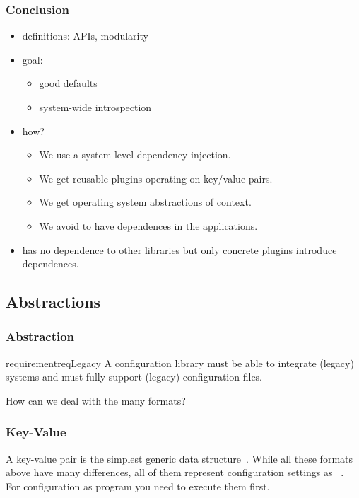 \begin{frame}
	\frametitle{Conclusion}
	\begin{itemize}
	\item definitions: APIs, modularity
	\item goal:
		\begin{itemize}
		\item good defaults
		\item system-wide introspection
		\end{itemize}
	\item how?
		\begin{itemize}
		\item We use a system-level dependency injection.
		\item We get reusable plugins operating on key/value pairs.
		\item We get operating system abstractions of context.
		\item We avoid to have dependences in the applications.
		\end{itemize}
	\item \elektra{} has no dependence to other libraries but only concrete plugins introduce dependences.
	\end{itemize}
\end{frame}






\subsection{Abstractions}

\begin{frame}
	\frametitle{Abstraction}
	\begin{restatable}{requirement}{reqLegacy}
	A configuration library must be able to integrate (legacy) systems and must fully support (legacy) configuration files.%
	\label{req:legacy}
	\end{restatable}

	\vspace{1cm}

	How can we deal with the many formats?
\end{frame}


\begin{frame}
	\frametitle{Key-Value}
A key-value pair is the simplest generic data structure~\cite{strang2004context}.
While all these formats above have many differences, all of them represent configuration settings as ~\cite{jin2014configurations,rabkin2011static,xu2013blame,lathia2013open}.
\\[1cm]

For configuration as program you need to execute them first.
\end{frame}

